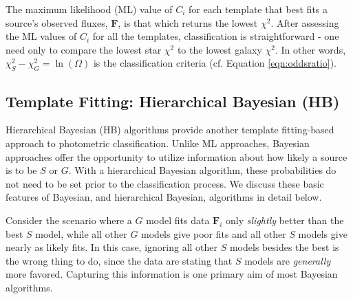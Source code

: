 \documentclass[12pt,preprint]{aastex}
\newcommand{\datavector}[1]{\boldsymbol{#1}}
\begin{document}
  

The maximum likelihood (ML) value of $C_i$ for each template that best
fits a source's observed fluxes, $\datavector{F}$, is that which
returns the lowest $\chi^2$. After assessing the ML values of $C_i$
for all the templates, classification is straightforward - one need
only to compare the lowest star $\chi^2$ to the lowest galaxy
$\chi^2$.  In other words, $\chi^2_S-\chi^2_G=\ln(\Omega)$ is the
classification criteria (cf. Equation \ref{eqn:oddsratio}).

\subsection{Template Fitting: Hierarchical Bayesian (HB)}
\label{ssec:HBmethod}

Hierarchical Bayesian (HB) algorithms provide another template
fitting-based approach to photometric classification.  Unlike ML
approaches, Bayesian approaches offer the opportunity to utilize
information about how likely a source is to be $S$ or $G$.  With a
hierarchical Bayesian algorithm, these probabilities do not need to be
set prior to the classification process.  We discuss these basic
features of Bayesian, and hierarchical Bayesian, algorithms in detail
below.


Consider the scenario where a $G$ model fits data $\datavector{F}_i$
only \textit{slightly} better than the best $S$ model, while all other
$G$ models give poor fits and all other $S$ models give nearly as
likely fits.  In this case, ignoring all other $S$ models besides the
best is the wrong thing to do, since the data are stating that $S$
models are \textit{generally} more favored.  Capturing this
information is one primary aim of most Bayesian algorithms.
\end{document}
